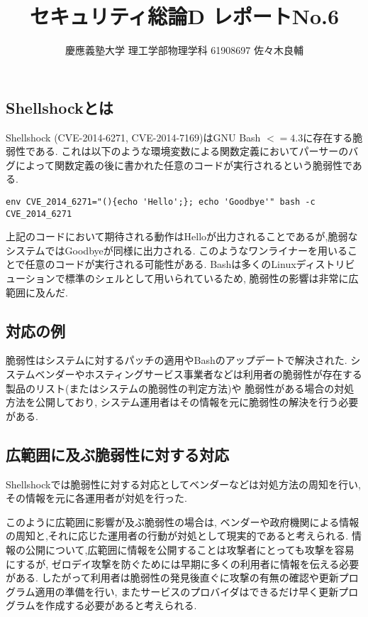 \documentclass[uplatex,a4j,11pt,dvipdfmx]{jsarticle}
\begin{document}
\title{セキュリティ総論D レポートNo.6}
\author{慶應義塾大学 理工学部物理学科 61908697 佐々木良輔}
\date{}
\maketitle
\subsection*{Shellshockとは}
Shellshock (CVE-2014-6271, CVE-2014-7169)はGNU Bash $<=4.3$に存在する脆弱性である.
これは以下のような環境変数による関数定義においてパーサーのバグによって関数定義の後に書かれた任意のコードが実行されるという脆弱性である.\cite{ShellSho53:online}
\begin{lstlisting}[caption=攻撃コード例]
env CVE_2014_6271="(){echo 'Hello';}; echo 'Goodbye'" bash -c CVE_2014_6271
\end{lstlisting}
上記のコードにおいて期待される動作はHelloが出力されることであるが,脆弱なシステムではGoodbyeが同様に出力される.
このようなワンライナーを用いることで任意のコードが実行される可能性がある.
Bashは多くのLinuxディストリビューションで標準のシェルとして用いられているため,
脆弱性の影響は非常に広範囲に及んだ.
\subsection*{対応の例}
脆弱性はシステムに対するパッチの適用やBashのアップデートで解決された.
システムベンダーやホスティングサービス事業者などは利用者の脆弱性が存在する製品のリスト(またはシステムの脆弱性の判定方法)や
脆弱性がある場合の対処方法を公開しており,
システム運用者はその情報を元に脆弱性の解決を行う必要がある.\cite{sakura}\cite{HITACHI}\cite{Redhat}\cite{IPA}
\subsection*{広範囲に及ぶ脆弱性に対する対応}
Shellshockでは脆弱性に対する対応としてベンダーなどは対処方法の周知を行い,
その情報を元に各運用者が対処を行った.

このように広範囲に影響が及ぶ脆弱性の場合は,
ベンダーや政府機関による情報の周知と,それに応じた運用者の行動が対処として現実的であると考えられる.
情報の公開について,広範囲に情報を公開することは攻撃者にとっても攻撃を容易にするが,
ゼロデイ攻撃を防ぐためには早期に多くの利用者に情報を伝える必要がある.
したがって利用者は脆弱性の発見後直ぐに攻撃の有無の確認や更新プログラム適用の準備を行い,
またサービスのプロバイダはできるだけ早く更新プログラムを作成する必要があると考えられる.

\end{document}
